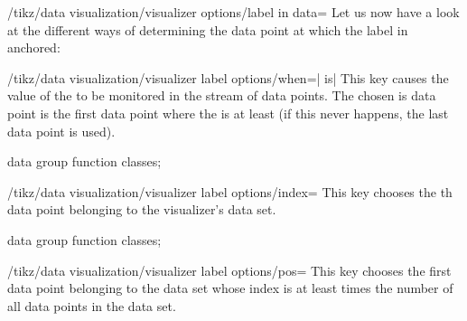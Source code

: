 \begin{key}{/tikz/data visualization/visualizer options/label in data=}
  Let us now have a look at the different ways of determining the data
  point at which the label in anchored:
  \begin{key}{/tikz/data visualization/visualizer label
      options/when=| is|}
    This key causes the value of the  to be monitored
    in the stream of data points. The chosen is data point is the
    first data point where the  is at least
     (if this never happens, the last data point is used).
\begin{codeexample}[width=6.3cm]
\tikz \datavisualization [
  school book axes,
  x axis={label=$x$},
  visualize as smooth line/.list={log, lin, squared, exp},
  log=    {label in data={text'=$\log x$, when=y is -1,
                          text colored}},
  lin=    {label in data={text=$x/2$,     when=x is 2}},
  squared={label in data={text=$x^2$,     when=x is 1.1}},
  exp=    {label in data={text=$e^x$,     when=x is -2,
                          text colored}},
  style sheet=vary hue]
data group {function classes};
\end{codeexample}
  \end{key}
  \begin{key}{/tikz/data visualization/visualizer label
      options/index=}
    This key chooses the th data point belonging to the
    visualizer's data set.
\begin{codeexample}[width=6.3cm]
\tikz \datavisualization [
  school book axes,
  x axis={label=$x$},
  visualize as smooth line/.list={exp},
  exp=    {label in data={text=$5$, index=5},
           label in data={text=$10$, index=10},
           label in data={text=$20$, index=20},
           style={mark=x}},
  style sheet=vary hue]
data group {function classes};
\end{codeexample}
  \end{key}
  \begin{key}{/tikz/data visualization/visualizer label options/pos=}
    This key chooses the first data point belonging to the data set
    whose index is at least  times the number of all
    data points in the data set.
\begin{codeexample}[width=6.3cm]
\tikz \datavisualization [
  school book axes,
  x axis={label=$x$},
  visualize as smooth line=exp,
  exp=    {label in data={text=$.2$, pos=0.2},
           label in data={text=$.5$, pos=0.5},
           label in data={text=$.95$, pos=0.95},
           style={mark=x}},
  style sheet=vary hue]

\end{codeexample}
\end{key}
\end{key}
